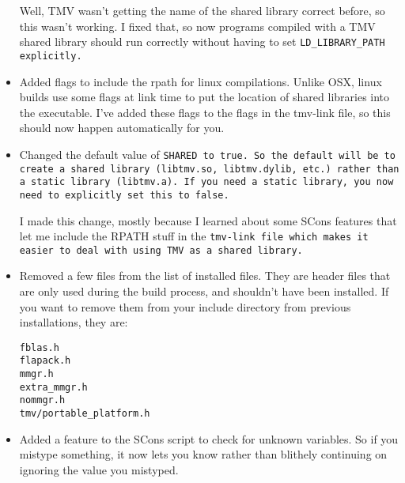 \begin{itemize}
Well, TMV wasn't getting the name of the shared library correct before,
so this wasn't working.  I fixed that, so now programs compiled with a 
TMV shared library should run correctly without having to set
\tt{LD\_LIBRARY\_PATH} explicitly.

\item
Added flags to include the rpath for linux compilations.  Unlike OSX,
linux builds use some flags at link time to put the location of shared 
libraries into the executable.  I've added these flags to the flags in
the tmv-link file, so this should now happen automatically for you.

\item
Changed the default value of \tt{SHARED} to true.  So the default will be
to create a shared library (\tt{libtmv.so}, \tt{libtmv.dylib}, etc.) rather than a 
static library (\tt{libtmv.a}).  If you need a static library, you now need
to explicitly set this to false.

I made this change, mostly because I learned about some SCons features
that let me include the RPATH stuff in the \tt{tmv-link} file which makes it
easier to deal with using TMV as a shared library.

\item
Removed a few files from the list of installed files.  They are header 
files that are only used during the build process, and shouldn't have 
been installed.  If you want to remove them from your include directory
from previous installations, they are:

\tt{fblas.h\\
flapack.h\\
mmgr.h\\
extra\_mmgr.h\\
nommgr.h\\
tmv/portable\_platform.h}

\item
Added a feature to the SCons script to check for unknown variables.
So if you mistype something, it now lets you know rather than blithely 
continuing on ignoring the value you mistyped.

\end{itemize}
